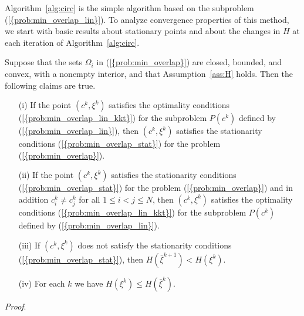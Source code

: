 \documentclass{siamltex}
\begin{document}
Algorithm~\ref{alg:circ} is the simple algorithm based on the
subproblem {(\ref{{prob:min_overlap_lin}})}. To analyze convergence
properties of this method, we start with basic results about
stationary points and about the changes in $H$ at each iteration of
Algorithm~\ref{alg:circ}.
\begin{lemma} \label{lem:cstat} Suppose that the sets $\Omega_i$ in
  {(\ref{{prob:min_overlap}})} are closed, bounded, and convex, with a
  nonempty interior, and that Assumption~\ref{ass:H} holds.  Then the
  following claims are true.
\begin{itemize}
\item[(i)] If the point $(c^k,\xi^k)$ satisfies the optimality
  conditions {(\ref{{prob:min_overlap_lin_kkt}})} for the subproblem
  $P(c^k)$ defined by {(\ref{{prob:min_overlap_lin}})}, then $(c^k,\xi^k)$
  satisfies the stationarity conditions {(\ref{{prob:min_overlap_stat}})}
  for the problem {(\ref{{prob:min_overlap}})}.
\item[(ii)] If the point $(c^k,\xi^k)$ satisfies the stationarity
  conditions {(\ref{{prob:min_overlap_stat}})} for the problem
  {(\ref{{prob:min_overlap}})} and in addition $c_i^k \neq c_j^k$ for all
  $1\le i < j \le N$, then $(c^k,\xi^k)$ satisfies the optimality
  conditions {(\ref{{prob:min_overlap_lin_kkt}})} for the subproblem
  $P(c^k)$ defined by {(\ref{{prob:min_overlap_lin}})}.
\item[(iii)] If $(c^k,\xi^k)$ does not satisfy the stationarity
  conditions {(\ref{{prob:min_overlap_stat}})}, then
  $H(\bar{\xi}^{k+1}) < H(\xi^k)$.
\item[(iv)] For each $k$ we have $H(\xi^k) \le H(\bar{\xi}^k)$.
\end{itemize}
\end{lemma}
{\em Proof}.
\end{document}
